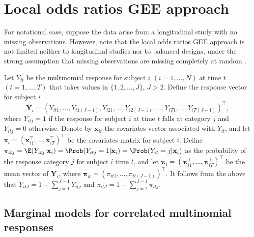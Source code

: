 \documentclass[
]{jss}
\begin{document}
\hypertarget{GEENotation}{%
\section{Local odds ratios GEE approach}\label{GEENotation}}

For notational ease, suppose the data arise from a longitudinal study
with no missing observations. However, note that the local odds ratios
GEE approach is not limited neither to longitudinal studies nor to
balanced designs, under the strong assumption that missing observations
are missing completely at random \citep{Rubin1976}.

Let \(Y_{it}\) be the multinomial response for subject \(i\)
\((i=1,\ldots,N)\) at time \(t\) \((t=1,\ldots,T)\) that takes values in
\(\{1,2,\ldots,J\}\), \(J>2\). Define the response vector for subject
\(i\)
\[\mathbf {Y}_{i}=(Y_{it1},\ldots,Y_{i1(J-1)},Y_{i21},\ldots,Y_{i2(J-1)},\ldots,Y_{iT1},\ldots,Y_{iT(J-1)})^{\top},\]
where \(Y_{itj}=1\) if the response for subject \(i\) at time \(t\)
falls at category \(j\) and \(Y_{itj}=0\) otherwise. Denote by
\(\mathbf{x}_{it}\) the covariates vector associated with \(Y_{it}\),
and let
\(\mathbf x_{i}=(\mathbf x^{\top}_{i1},\ldots,\mathbf x^{\top}_{iT})^{\top}\)
be the covariates matrix for subject \(i\). Define
\(\pi_{itj}= \E(Y_{itj}|\mathbf x_i)=\Prob(Y_{itj}=1| \mathbf x_i)=\Prob(Y_{it}=j| \mathbf x_i)\)
as the probability of the response category \(j\) for subject \(i\) time
\(t\), and let
\(\boldsymbol \pi_{i}=(\boldsymbol \pi^{\top}_{i1},\ldots,\boldsymbol \pi^{\top}_{iT})^{\top}\)
be the mean vector of \(\mathbf Y_i\), where
\(\boldsymbol{\pi}_{it} = (\pi_{it1},\ldots,\pi_{it(J-1)})^{\top}\). It
follows from the above that \(Y_{itJ}=1-\sum_{j=1}^{J-1} Y_{itj}\) and
\(\pi_{itJ}=1-\sum_{j=1}^{J-1} \pi_{itj}\).

\hypertarget{marginal-models-for-correlated-multinomial-responses}{%
\subsection{Marginal models for correlated multinomial
responses}\label{marginal-models-for-correlated-multinomial-responses}}
\end{document}
